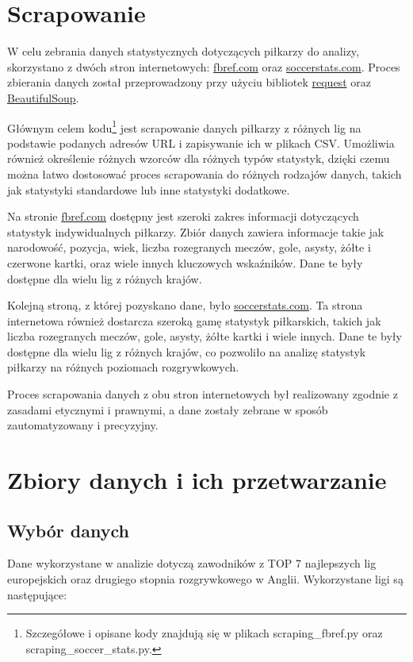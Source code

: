 \documentclass{article}
\begin{document}
\section{Scrapowanie}
W celu zebrania danych statystycznych dotyczących piłkarzy do analizy, skorzystano z dwóch stron internetowych: \href{https://fbref.com/en/}{fbref.com} oraz \href{https://www.soccerstats247.com/}{soccerstats.com}. Proces zbierania danych został przeprowadzony przy użyciu bibliotek \href{https://pypi.org/project/requests/}{request} oraz \href{https://pypi.org/project/beautifulsoup4/}{BeautifulSoup}.

Głównym celem kodu\footnote{Szczegółowe i opisane kody znajdują się w plikach scraping\_fbref.py oraz scraping\_soccer\_stats.py.} jest scrapowanie danych piłkarzy z różnych lig na podstawie podanych adresów URL i zapisywanie ich w plikach CSV. Umożliwia również określenie różnych wzorców dla różnych typów statystyk, dzięki czemu można łatwo dostosować proces scrapowania do różnych rodzajów danych, takich jak statystyki standardowe lub inne statystyki dodatkowe.

Na stronie \href{https://fbref.com/en/}{fbref.com} dostępny jest szeroki zakres informacji dotyczących statystyk indywidualnych piłkarzy. Zbiór danych zawiera informacje takie jak narodowość, pozycja, wiek, liczba rozegranych meczów, gole, asysty, żółte i czerwone kartki, oraz wiele innych kluczowych wskaźników. Dane te były dostępne dla wielu lig z różnych krajów.

Kolejną stroną, z której pozyskano dane, było \href{https://www.soccerstats247.com/}{soccerstats.com}. Ta strona internetowa również dostarcza szeroką gamę statystyk piłkarskich, takich jak liczba rozegranych meczów, gole, asysty, żółte kartki i wiele innych. Dane te były dostępne dla wielu lig z różnych krajów, co pozwoliło na analizę statystyk piłkarzy na różnych poziomach rozgrywkowych.

Proces scrapowania danych z obu stron internetowych był realizowany zgodnie z zasadami etycznymi i prawnymi, a dane zostały zebrane w sposób zautomatyzowany i precyzyjny.

\section{Zbiory danych i ich przetwarzanie}

\subsection{Wybór danych}
Dane wykorzystane w analizie dotyczą zawodników z TOP 7 najlepszych lig europejskich oraz drugiego stopnia rozgrywkowego w Anglii. Wykorzystane ligi są następujące:
\end{document}
